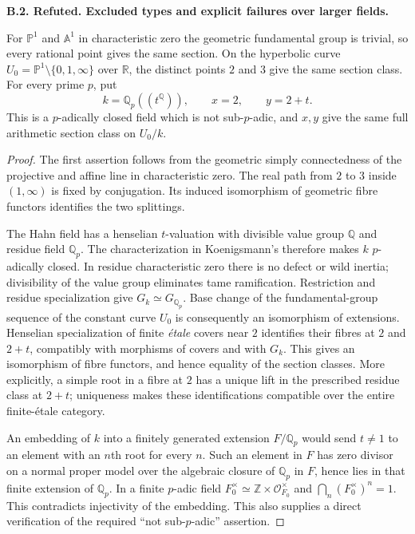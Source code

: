 \documentclass[11pt,oneside]{article}
\makeatletter
\newcounter{statementanchor}
\newenvironment{statement}[3]{%
 \refstepcounter{statementanchor}\def\@currentlabel{#1}%
 \par\addvspace{9pt}\noindent
 \textbf{#1. #2. #3.}\par\nobreak\noindent\ignorespaces
}{\par\addvspace{5pt}}
\makeatother
\begin{document}
\begin{statement}{B.2}{Refuted}{Excluded types and explicit failures over larger fields}
\label{st:B.2}

For $\mathbb P^1$ and $\mathbb A^1$ in characteristic zero the geometric
fundamental group is trivial, so every rational point gives the same
section.  On the hyperbolic curve
$U_0=\mathbb P^1\setminus\{0,1,\infty\}$ over $\mathbb R$, the distinct
points $2$ and $3$ give the same section class.  For every prime $p$, put
\[
 k=\mathbb Q_p((t^{\mathbb Q})),\qquad x=2,\qquad y=2+t.
\]
This is a $p$-adically closed field which is not sub-$p$-adic, and $x,y$
give the same full arithmetic section class on $U_0/k$.
\end{statement}
\begin{proof}
The first assertion follows from the geometric simply connectedness of
the projective and affine line in characteristic zero.  The real path
from $2$ to $3$ inside $(1,\infty)$ is fixed by conjugation.  Its induced
isomorphism of geometric fibre functors identifies the two splittings.

The Hahn field has a henselian $t$-valuation with divisible value group
$\mathbb Q$ and residue field $\mathbb Q_p$.  The characterization in
Koenigsmann's \cite[\S1, Fact on $p$-adically closed fields]{B_Koenigsmann}
therefore makes $k$ $p$-adically closed.  In residue characteristic zero
there is no defect or wild inertia; divisibility of the value group
eliminates tame ramification.  Restriction and residue specialization
give $G_k\simeq G_{\mathbb Q_p}$.
Base change of the fundamental-group sequence of the constant curve
$U_0$ is consequently an isomorphism of extensions.  Henselian
specialization of finite \emph{\'etale} covers near $2$ identifies their
fibres at $2$ and $2+t$, compatibly with morphisms of covers and with
$G_k$.  This gives an isomorphism of fibre functors, and hence equality
of the section classes.  More explicitly, a simple root in a fibre at
$2$ has a unique lift in the prescribed residue class at $2+t$;
uniqueness makes these identifications compatible over the entire
finite-\'etale category.

An embedding of $k$ into a finitely generated extension $F/\mathbb Q_p$
would send $t\ne1$ to an element with an $n$th root for every $n$.
Such an element in $F$ has zero divisor on a normal proper model over
the algebraic closure of $\mathbb Q_p$ in $F$, hence lies in that finite
extension of $\mathbb Q_p$.  In a finite $p$-adic field
$F_0^\times\simeq\mathbb Z\times\mathcal O_{F_0}^\times$ and
$\bigcap_n(F_0^\times)^n=1$.  This contradicts injectivity of the
embedding.  This also supplies a direct verification of the required
``not sub-$p$-adic'' assertion.
\end{proof}
\end{document}
